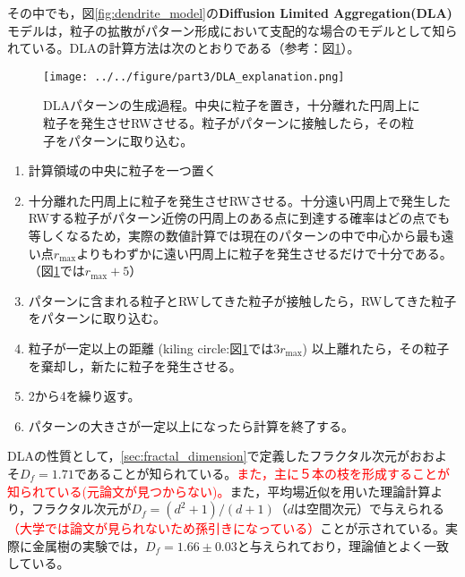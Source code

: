 \documentclass[autodetect-engine,dvi=dvipdfmx,a4paper,ja=standard,oneside,openany,11pt]{bxjsbook}
\begin{document}
その中でも，図\ref{fig:dendrite_model}の\textbf{Diffusion Limited Aggregation(DLA)}モデル\cite{witten1981diffusion}は，粒子の拡散がパターン形成において支配的な場合のモデルとして知られている。DLAの計算方法は次のとおりである（参考：図\ref{fig:DLA_explanation}\cite{松下貢1987dla}）。

\begin{figure}[htbp]
  \centering
  \texttt{[image: ../../figure/part3/DLA\_explanation.png]}
  \caption{DLAパターンの生成過程。中央に粒子を置き，十分離れた円周上に粒子を発生させRWさせる。粒子がパターンに接触したら，その粒子をパターンに取り込む。}
  \label{fig:DLA_explanation}
\end{figure}

\begin{enumerate}
  \item 計算領域の中央に粒子を一つ置く
  \item 十分離れた円周上に粒子を発生させRWさせる。十分遠い円周上で発生したRWする粒子がパターン近傍の円周上のある点に到達する確率はどの点でも等しくなるため，実際の数値計算では現在のパターンの中で中心から最も遠い点$r_\mathrm{max}$よりもわずかに遠い円周上に粒子を発生させるだけで十分である。（図\ref{fig:DLA_explanation}では$r_{\mathrm{max}}+5$）
  \item パターンに含まれる粒子とRWしてきた粒子が接触したら，RWしてきた粒子をパターンに取り込む。
  \item 粒子が一定以上の距離 (kiling circle:図\ref{fig:DLA_explanation}では$3r_{\mathrm{max}}$) 以上離れたら，その粒子を棄却し，新たに粒子を発生させる。
  \item 2から4を繰り返す。
  \item パターンの大きさが一定以上になったら計算を終了する。
\end{enumerate}

DLAの性質として，\ref{sec:fractal_dimension}で定義したフラクタル次元がおおよそ$D_f=1.71$であることが知られている\cite{太田正之輔2009dla}。\textcolor{red}{また，主に５本の枝を形成することが知られている(元論文が見つからない)。}また，平均場近似を用いた理論計算より，フラクタル次元が$D_f=(d^2+1)/(d+1)$（$d$は空間次元）で与えられる\cite{muthukumar1983mean}\textcolor{red}{\cite{tokuyama1984fractal}（大学では論文が見られないため孫引きになっている）}ことが示されている。実際に金属樹の実験\cite{matsushita1984fractal}では，$D_f=1.66\pm0.03$と与えられており，理論値とよく一致している。
\end{document}
